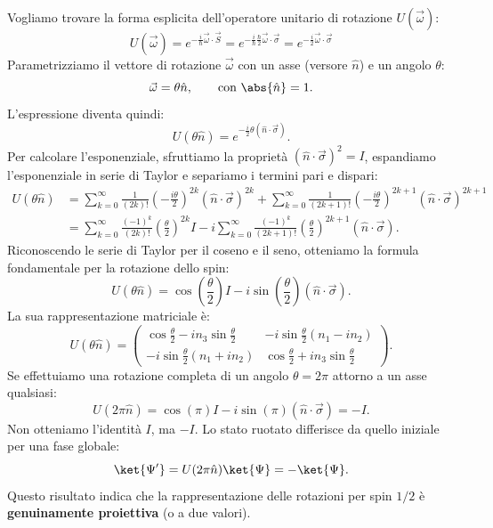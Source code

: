 Vogliamo trovare la forma esplicita dell'operatore unitario di rotazione \(U(\vec{\omega})\):
\[
    U(\vec{\omega}) = e^{-\frac{i}{\hbar}\vec{\omega}\cdot\vec{S}}
    = e^{-\frac{i}{\hbar}\frac{\hbar}{2}\vec{\omega}\cdot\vec{\sigma}} = e^{-\frac{i}{2}\vec{\omega}\cdot\vec{\sigma}}
\]
Parametrizziamo il vettore di rotazione \(\vec{\omega}\) con un asse (versore \(\hat{n}\)) e un angolo \(\theta\):
\[
    \vec{\omega} = \theta \hat{n}, \qquad \text{con } \abs{\hat{n}}=1.
\]
L'espressione diventa quindi:
\[
    U(\theta \hat{n}) = e^{-\frac{i}{2}\theta (\hat{n}\cdot\vec{\sigma})}.
\]
Per calcolare l'esponenziale, sfruttiamo la proprietà \((\hat{n}\cdot\vec{\sigma})^2 = I\),
espandiamo l'esponenziale in serie di Taylor e separiamo i termini pari e dispari:
\begin{align*}
    U(\theta\hat{n}) &= \sum_{k=0}^{\infty} \frac{1}{(2k)!} \left(-\frac{i\theta}{2}\right)^{2k} (\hat{n}\cdot\vec{\sigma})^{2k} + \sum_{k=0}^{\infty} \frac{1}{(2k+1)!} \left(-\frac{i\theta}{2}\right)^{2k+1} (\hat{n}\cdot\vec{\sigma})^{2k+1} \\
    &= \sum_{k=0}^{\infty} \frac{(-1)^k}{(2k)!} \left(\frac{\theta}{2}\right)^{2k} I - i \sum_{k=0}^{\infty} \frac{(-1)^k}{(2k+1)!} \left(\frac{\theta}{2}\right)^{2k+1} (\hat{n}\cdot\vec{\sigma}).
\end{align*}
Riconoscendo le serie di Taylor per il coseno e il seno, otteniamo la formula fondamentale per la rotazione dello spin:
\begin{equation}
    U(\theta \hat{n}) = \cos(\frac{\theta}{2})I - i \sin(\frac{\theta}{2}) (\hat{n}\cdot\vec{\sigma}).
\end{equation}
La sua rappresentazione matriciale è:
\[
    U(\theta\hat{n}) =
    \begin{pmatrix}
        \cos\frac{\theta}{2} - i n_3 \sin\frac{\theta}{2} & -i\sin\frac{\theta}{2}(n_1 - i n_2) \\
        -i\sin\frac{\theta}{2}(n_1 + i n_2) & \cos\frac{\theta}{2} + i n_3 \sin\frac{\theta}{2}
    \end{pmatrix}.
\]
Se effettuiamo una rotazione completa di un angolo \(\theta = 2\pi\) attorno a un asse qualsiasi:
\[
    U(2\pi \hat{n}) = \cos(\pi)I - i \sin(\pi)(\hat{n}\cdot\vec{\sigma}) = -I.
\]
Non otteniamo l'identità \(I\), ma \(-I\). Lo stato ruotato differisce da quello iniziale per una fase globale:
\[
    \ket{\Psi'} = U(2\pi\hat{n})\ket{\Psi} = -\ket{\Psi}.
\]
Questo risultato indica che la rappresentazione delle rotazioni per spin \(1/2\) è \textbf{genuinamente proiettiva} (o a due valori).
